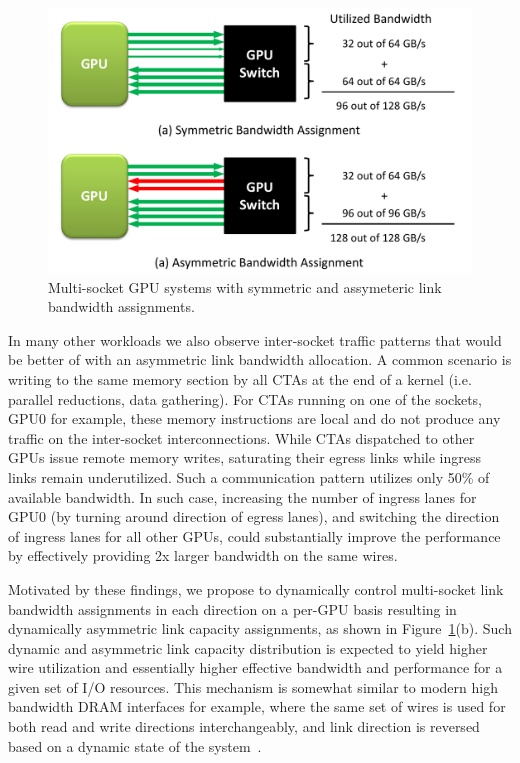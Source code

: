 \begin{figure}[t]
    \centering
    \includegraphics[width=1.0\columnwidth]{figures/link_assignment.pdf}
    \caption{Multi-socket GPU systems with symmetric and assymeteric link
    bandwidth assignments.}
    \label{fig:symmetric_assymetric}
    \vspace{-.2in}
\end{figure}

In many other workloads we also observe inter-socket traffic patterns that
would be better of with an asymmetric link bandwidth allocation. A common
scenario is writing to the same memory section by all CTAs at the end of a
kernel (i.e. parallel reductions, data gathering). For CTAs running on one of the
sockets, GPU0 for example, these memory instructions are local and do not
produce any traffic on the inter-socket interconnections. While CTAs dispatched
to other GPUs issue remote memory writes, saturating their egress links while
ingress links remain underutilized. Such a communication pattern utilizes only
50\% of available bandwidth. In such case, increasing the number of ingress lanes for GPU0
(by turning around direction of egress lanes), and switching the direction of
ingress lanes for all other GPUs, could substantially improve the performance
by effectively providing 2x larger bandwidth on the same wires. 

Motivated by these findings, we propose to dynamically control multi-socket
link bandwidth assignments in each direction on a per-GPU basis resulting in
dynamically asymmetric link capacity assignments, as shown in
Figure~\ref{fig:symmetric_assymetric}(b). Such dynamic and asymmetric link
capacity distribution is expected to yield higher wire utilization and
essentially higher effective bandwidth and performance for a given set of I/O
resources. This mechanism is somewhat similar to modern high bandwidth DRAM
interfaces for example,
where the same set of wires is used for both read and write directions
interchangeably, and link direction is reversed based on a dynamic state of the
system~\cite{jedec13-hbm}. 


